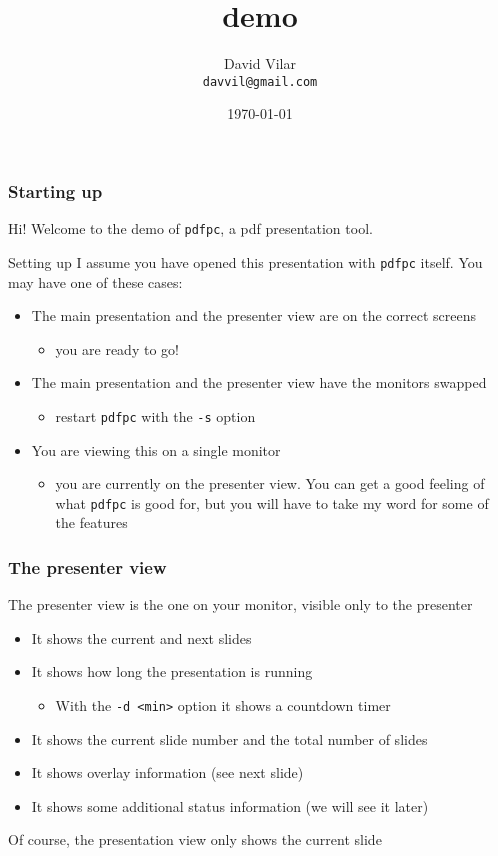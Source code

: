 \documentclass{beamer}
\title{\pdfpc demo}
\author[D. Vilar]{David Vilar \\ \texttt{davvil@gmail.com}}
\date{\today}
\institute{}
\newcommand{\singleitem}[1]{\begin{itemize}\item #1\end{itemize}}
\newcommand{\pdfpc}{\texttt{pdfpc}\xspace}
\newcommand{\opt}[1]{\texttt{#1}\xspace}
\begin{document}
\begin{frame}
  \titlepage
  \hypertarget{titlePage}{}
\end{frame}

\begin{frame}
  \frametitle{Starting up}
  Hi! Welcome to the demo of \pdfpc, a pdf presentation tool.
  \begin{block}{Setting up}
    I assume you have opened this presentation with \pdfpc itself. You may have
    one of these cases:
    \begin{itemize}
      \item The main presentation and the presenter view are on the correct
        screens
          \singleitem{you are ready to go!}
      \item The main presentation and the presenter view have the monitors
        swapped
          \singleitem{restart \pdfpc with the \opt{-s} option}
      \item You are viewing this on a single monitor
          \singleitem{you are currently on the presenter view. You can get a
          good feeling of what \pdfpc is good for, but you will have to take
          my word for some of the features}
    \end{itemize}
  \end{block}
\end{frame}

\begin{frame}
  \frametitle{The presenter view}
  The presenter view is the one on your monitor, visible only to the presenter
  \begin{itemize}
    \item It shows the current and next slides
    \item It shows how long the presentation is running
      \singleitem{With the \opt{-d <min>} option it shows a countdown timer}
    \item It shows the current slide number and the total number of slides
    \item It shows overlay information (see next slide)
    \item It shows some additional status information (we will see it later)
  \end{itemize}
  Of course, the presentation view only shows the current slide
\end{frame}
\end{document}
